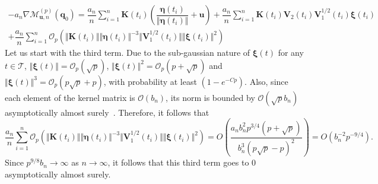 \documentclass[aos]{imsart}
\theoremstyle{plain}
\theoremstyle{remark}
\newcommand{\Mcal}{\mathcal{M}}
\newcommand{\Tcal}{\mathcal{T}}
\newcommand{\bb}[1]{\boldsymbol{#1}}
\begin{document}
\begin{multline*}
    -a_n \nabla \Mcal_{\bb{u},n}^{(p)}(\bb{q}_0)
    = \dfrac{a_n}{n} \sum_{i=1}^n \bb{K}(t_i) \left(\dfrac{\bb{\eta}(t_i)}{\Vert \bb{\eta}(t_i)\Vert} + \bb{u} \right) + \dfrac{a_n}{n} \sum_{i=1}^n \bb{K}(t_i) \bb{V}_2(t_i)\bb{V}_1^{1/2}(t_i) \bb{\xi}(t_i)\\
    + \dfrac{a_n}{n}\sum_{i=1}^n \mathcal{O}_p(\Vert \bb{K}(t_i) \Vert \Vert \bb{\eta}(t_i)\Vert^{-3} \Vert \bb{V}_1^{1/2}(t_i) \Vert \Vert \bb{\xi}(t_i) \Vert^2)
\end{multline*}
\noindent Let us start with the third term. Due to the sub-gaussian nature of $\bb{\xi}(t)$ for any $t \in \Tcal$, $\Vert \bb{\xi}(t) \Vert = \mathcal{O}_p(\sqrt{p})$, $\Vert \bb{\xi}(t) \Vert^2 = \mathcal{O}_p(p + \sqrt{p})$ and $\Vert \bb{\xi}(t)\Vert^3 = \mathcal{O}_p(p\sqrt{p} + p)$, with probability at least $(1 - e^{-Cp})$. Also, since each element of the kernel matrix is $\mathcal{O}(b_n)$, its norm is bounded by $\mathcal{O}(\sqrt{p}b_n)$ asymptotically almost surely~\citep{tao2012topics}. Therefore, it follows that
\begin{equation*}
    \dfrac{a_n}{n}\sum_{i=1}^n \mathcal{O}_p(\Vert \bb{K}(t_i) \Vert \Vert \bb{\eta}(t_i)\Vert^{-3} \Vert \bb{V}_1^{1/2}(t_i)\Vert \Vert \bb{\xi}(t_i) \Vert^2)
    = O\left( \dfrac{a_n b_n^2 p^{3/4} (p+\sqrt{p}) }{b_n^3 (p\sqrt{p} - p)^2 } \right) = O\left( b_n^{-2}p^{-9/4} \right).
\end{equation*}
\noindent Since $p^{9/8}b_n \rightarrow \infty$ as $n \rightarrow \infty$, it follows that this third term goes to $0$ asymptotically almost surely.
\end{document}
